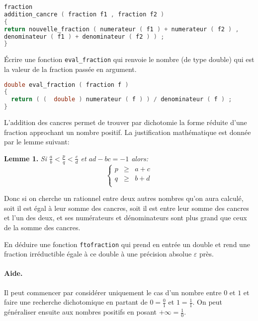 \begin{solution}
  \begin{lstlisting}[language=C]
fraction
addition_cancre ( fraction f1 , fraction f2 )
{
return nouvelle_fraction ( numerateur ( f1 ) + numerateur ( f2 ) ,
denominateur ( f1 ) + denominateur ( f2 ) ) ;
}
\end{lstlisting}
\end{solution}

\question Écrire une fonction \texttt{eval\_fraction} qui renvoie le
nombre (de type double) qui est la valeur de la fraction passée en
argument.
\begin{solution}
  \begin{lstlisting}[language=C]
double eval_fraction ( fraction f ) 
{ 
  return ( (  double ) numerateur ( f ) ) / denominateur ( f ) ; 
}
\end{lstlisting}
\end{solution}


L’addition des cancres permet de trouver par dichotomie la forme réduite d’une fraction
approchant un nombre positif. La justification mathématique est donnée par le lemme suivant:
\begin{trivlist}
\item \textbf{Lemme 1.} \em
Si \(\frac ab < \frac pq < \frac cd\) et \(ad-bc = -1\) alors:
\[
  \left\lbrace
    \begin{array}{rcl}
      p&\ge&a+c\\
      q&\ge&b+d\\
    \end{array}
  \right.
\]
\end{trivlist}

Donc si on cherche un rationnel entre deux autres nombres qu’on aura calculé, soit il est
égal à leur somme des cancres, soit il est entre leur somme des cancres et l’un des deux, et ses
numérateurs et dénominateurs sont plus grand que ceux de la somme des cancres.


\question En déduire une fonction \texttt{ftofraction} qui prend en
entrée un double et rend une fraction irréductible égale à ce double à
une précision absolue \(\varepsilon\) près.  
\paragraph{Aide.} Il peut commencer par considérer uniquement
le cas d’un nombre entre \(0\) et \(1\)  et faire une recherche
dichotomique en partant de \(0 = \frac 01\) et \(1 = \frac 11\). On peut généraliser ensuite aux nombres positifs en posant \(+\infty=\frac 10\).  
